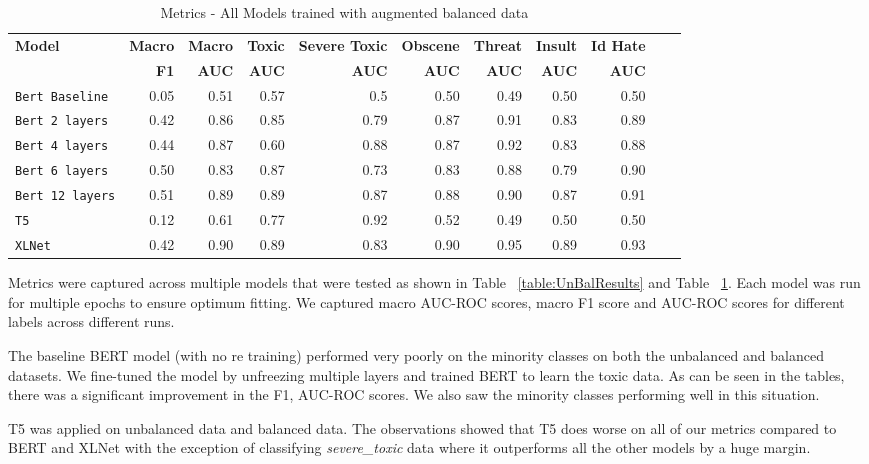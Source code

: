 \documentclass[11pt,a4paper]{article}
\begin{document}
\begin{table}
\centering
\begin{tabular}{lrrrrrrrrrr}
\hline
\textbf{Model} & \textbf{Macro} & \textbf{Macro} & \textbf{Toxic} & \textbf{Severe Toxic} & \textbf{Obscene} & \textbf{Threat} & \textbf{Insult} & \textbf{Id Hate}
\\
\textbf{ } & \textbf{F1} & \textbf{AUC} & \textbf{AUC} & \textbf{AUC} & \textbf{AUC} & \textbf{AUC} & \textbf{AUC} & \textbf{AUC}\\
\hline
\verb|Bert Baseline| & 0.05 & 0.51 & 0.57 & 0.5 & 0.50 & 0.49 & 0.50 & 0.50 \\
\verb|Bert 2 layers| & 0.42 & 0.86 & 0.85 & 0.79 & 0.87 & 0.91 & 0.83 & 0.89 \\
\verb|Bert 4 layers| & 0.44 & 0.87 & 0.60 & 0.88 & 0.87 & 0.92 & 0.83 & 0.88 \\
\verb|Bert 6 layers| & 0.50 & 0.83 & 0.87 & 0.73 & 0.83 & 0.88 & 0.79 & 0.90 \\
\verb|Bert 12 layers| & 0.51 & 0.89 & 0.89 & 0.87 & 0.88 & 0.90 & 0.87 & 0.91 \\
\verb|T5| & 0.12 & 0.61 & 0.77 & 0.92 & 0.52 & 0.49 & 0.50 & 0.50 \\
\verb|XLNet| & 0.42 & 0.90 & 0.89 & 0.83 & 0.90 & 0.95 & 0.89 & 0.93 \\
\hline
\end{tabular}
\caption{Metrics - All Models trained with augmented balanced data}
\label{table:BalResults}
\end{table}

Metrics were captured across multiple models that were tested as shown in Table ~\ref{table:UnBalResults} and Table ~\ref{table:BalResults}. Each model was run for multiple epochs to ensure optimum fitting. We captured macro AUC-ROC scores, macro F1 score and AUC-ROC scores for different labels across different runs.

The baseline BERT model (with no re training) performed very poorly on the minority classes on both the unbalanced and balanced datasets. We fine-tuned the model by unfreezing multiple layers and trained BERT to learn the toxic data. As can be seen in the tables, there was a significant improvement in the F1, AUC-ROC scores. We also saw the minority classes performing well in this situation.

T5 was applied on unbalanced data and balanced data. The observations showed that T5 does worse on all of our metrics compared to BERT and XLNet with the exception of classifying \emph{severe\_toxic} data where it outperforms all the other models by a huge margin.
\end{document}
